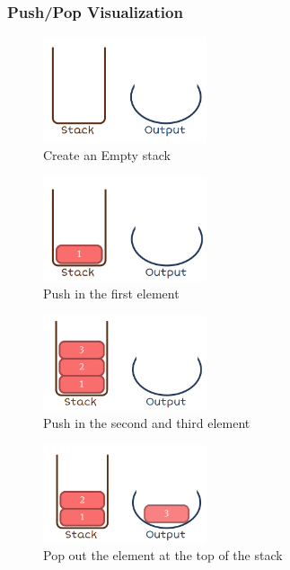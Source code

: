 \subsubsection{Push/Pop Visualization}
\begin{figure}[h]
		\centering
		\includegraphics[width=0.43\textwidth]{figures/empty-stack}
		\caption{Create an Empty stack}
\end{figure}
\begin{figure}[h]
	\centering
	\includegraphics[width=0.43\textwidth]{figures/push-1}
	\caption{Push in the first element}
\end{figure}
\begin{figure}[h]
	\centering
	\includegraphics[width=0.43\textwidth]{figures/push-2-3}
	\caption{Push in the second and third element}
\end{figure}
\newpage
\begin{figure}[h]
	\centering
	\includegraphics[width=0.43\textwidth]{figures/pop-3}
	\caption{Pop out the element at the top of the stack}
\end{figure}

